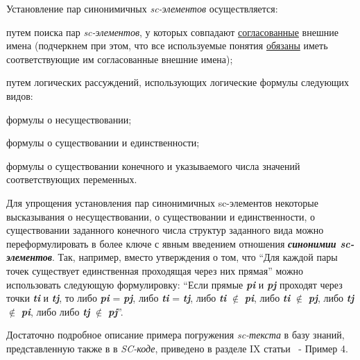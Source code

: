 \begin{SCn}
{Установление пар синонимичных \textit{sc-элементов} осуществляется:
\begin{scnitemize}
    \item путем поиска пар \textit{sc-элементов}, у которых совпадают \underline{согласованные} внешние имена (подчеркнем при этом, что все используемые понятия \underline{обязаны} иметь соответствующие им согласованные внешние имена);
    \item путем логических рассуждений, использующих логические формулы следующих видов:
     \begin{scnitemizeii}
        \item формулы о несуществовании;
        \item формулы о существовании и единственности;
        \item формулы о существовании конечного и указываемого числа значений соответствующих переменных.
    \end{scnitemizeii}
\end{scnitemize}

Для упрощения установления пар синонимичных sc-элементов некоторые высказывания о несуществовании, о существовании и единственности, о существовании заданного конечного числа структур заданного вида можно переформулировать в более  ключе с явным введением отношения \textit{\textbf{синонимии sc-элементов}}. Так, например, вместо утверждения о том, что ``Для каждой пары точек существует единственная проходящая через них прямая'' можно использовать следующую формулировку: ``Если прямые \textit{\textbf{pi}} и \textit{\textbf{pj}} проходят через точки \textit{\textbf{ti}} и \textit{\textbf{tj}}, то либо \textit{\textbf{pi}} = \textit{\textbf{pj}}, либо \textit{\textbf{ti}} = \textit{\textbf{tj}}, либо \textit{\textbf{ti}} $\notin$ \textit{\textbf{pi}}, либо \textit{\textbf{ti}} $\notin$ \textit{\textbf{pj}}, либо \textit{\textbf{tj}} $\notin$ \textit{\textbf{pi}}, либо либо \textit{\textbf{tj}} $\notin$ \textit{\textbf{pj}}''. 

Достаточно подробное описание примера погружения \textit{sc-текста} в базу знаний, представленную также в в \textit{SC-коде}, приведено в разделе IX статьи~\cite{Golenkov2018} - Пример 4.

}
\end{SCn}
